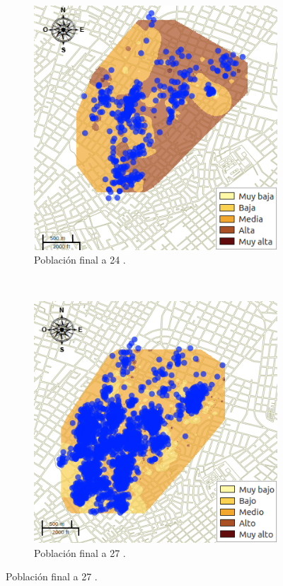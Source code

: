 \begin{figure}[!htpb]
    \begin{subfigure}[b]{0.225\textwidth}
        \includegraphics[width=\textwidth]{./graphics/temp-24-final.png}
        \caption{ Población final a 24 \textcelsius.}
    \end{subfigure}
    ~~~~
    \begin{subfigure}[b]{0.225\textwidth}
        \includegraphics[width=\textwidth]{../book/capitulo-6/graphics/raster/temp-27-49.png}
        \caption{ Población final a 27 \textcelsius.}
    \end{subfigure}


\end{figure}
